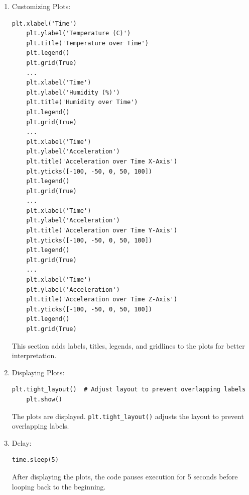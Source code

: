 \begin{enumerate}
\begin{lstlisting}[caption={Plotting}]
    # Plot for temperature
    plt.subplot(5, 1, 1)
    plt.plot(timestamps, temperatures, label='Temperature (C)', color='red')
    ...
    # Plot for humidity
    plt.subplot(5, 1, 2)
    plt.plot(timestamps, humidities, label='Humidity (%)', color='blue')
    ...
    # Plot for acceleration x
    plt.subplot(5, 1, 3)
    plt.plot(timestamps, accelerations_x, label='Acceleration X', color='green')
    ...
    # Plot for acceleration y
    plt.subplot(5, 1, 4)
    plt.plot(timestamps, accelerations_y, label='Acceleration Y', color='orange')
    ...
    # Plot for acceleration z
    plt.subplot(5, 1, 5)
    plt.plot(timestamps, accelerations_z, label='Acceleration Z', color='purple')
    \end{lstlisting}
    Listing 5.13 initializes a new figure for the plots with a specific size.
    Creates five subplots within the figure, one for temperature, one for humidity, and one for each acceleration axis, and plots the corresponding data.
    \item Customizing Plots:
    \begin{lstlisting}[caption={Customizing Plots}]
    plt.xlabel('Time')
    plt.ylabel('Temperature (C)')
    plt.title('Temperature over Time')
    plt.legend()
    plt.grid(True)
    ...
    plt.xlabel('Time')
    plt.ylabel('Humidity (%)')
    plt.title('Humidity over Time')
    plt.legend()
    plt.grid(True)
    ...
    plt.xlabel('Time')
    plt.ylabel('Acceleration')
    plt.title('Acceleration over Time X-Axis')
    plt.yticks([-100, -50, 0, 50, 100])
    plt.legend()
    plt.grid(True)
    ...
    plt.xlabel('Time')
    plt.ylabel('Acceleration')
    plt.title('Acceleration over Time Y-Axis')
    plt.yticks([-100, -50, 0, 50, 100])
    plt.legend()
    plt.grid(True)
    ...
    plt.xlabel('Time')
    plt.ylabel('Acceleration')
    plt.title('Acceleration over Time Z-Axis')
    plt.yticks([-100, -50, 0, 50, 100])
    plt.legend()
    plt.grid(True)
    \end{lstlisting}
    This section adds labels, titles, legends, and gridlines to the plots for better interpretation.
    \item Displaying Plots:
    \begin{lstlisting}[caption={Displaying Plots}]
    plt.tight_layout()  # Adjust layout to prevent overlapping labels
    plt.show()
    \end{lstlisting}
    The plots are displayed. \lstinline{plt.tight_layout()} adjusts the layout to prevent overlapping labels.
    \item Delay:
    \begin{lstlisting}[caption={Delay}]
    time.sleep(5)
    \end{lstlisting}
    After displaying the plots, the code pauses execution for 5 seconds before looping back to the beginning.
\end{enumerate}